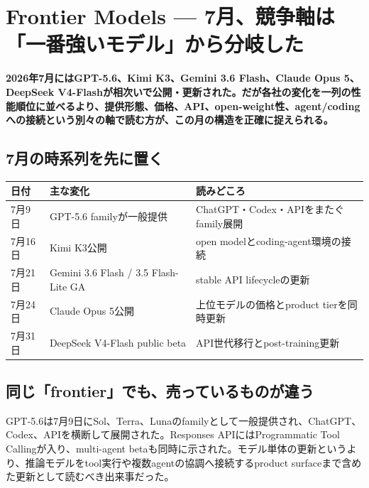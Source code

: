 \section{Frontier Models — 7月、競争軸は「一番強いモデル」から分岐した}
\label{pkg:frontier-models-july}
\noindent\textbf{2026年7月にはGPT-5.6、Kimi K3、Gemini 3.6 Flash、Claude Opus 5、DeepSeek V4-Flashが相次いで公開・更新された。だが各社の変化を一列の性能順位に並べるより、提供形態、価格、API、open-weight性、agent/codingへの接続という別々の軸で読む方が、この月の構造を正確に捉えられる。}\autocite{src-9191d43918fc,src-a24fd97eb3d0,src-e19fbb75eb44,src-e547d0d8cbe3,src-f6aa679babd7}

\subsection{7月の時系列を先に置く}

\begin{center}
\small
\begin{tabularx}{\columnwidth}{>{\raggedright\arraybackslash}X|>{\raggedright\arraybackslash}X|>{\raggedright\arraybackslash}X}
\toprule
\textbf{日付} & \textbf{主な変化} & \textbf{読みどころ} \\
\midrule
7月9日 & GPT-5.6 familyが一般提供 & ChatGPT・Codex・APIをまたぐfamily展開 \\
7月16日 & Kimi K3公開 & open modelとcoding-agent環境の接続 \\
7月21日 & Gemini 3.6 Flash / 3.5 Flash-Lite GA & stable API lifecycleの更新 \\
7月24日 & Claude Opus 5公開 & 上位モデルの価格とproduct tierを同時更新 \\
7月31日 & DeepSeek V4-Flash public beta & API世代移行とpost-training更新 \\
\bottomrule
\end{tabularx}
\autocite{src-9191d43918fc,src-a24fd97eb3d0,src-e19fbb75eb44,src-e547d0d8cbe3,src-f6aa679babd7}
\end{center}

\subsection{同じ「frontier」でも、売っているものが違う}

GPT-5.6は7月9日にSol、Terra、Lunaのfamilyとして一般提供され、ChatGPT、Codex、APIを横断して展開された。Responses APIにはProgrammatic Tool Callingが入り、multi-agent betaも同時に示された。モデル単体の更新というより、推論モデルをtool実行や複数agentの協調へ接続するproduct surfaceまで含めた更新として読むべき出来事だった。\autocite{src-e19fbb75eb44}


